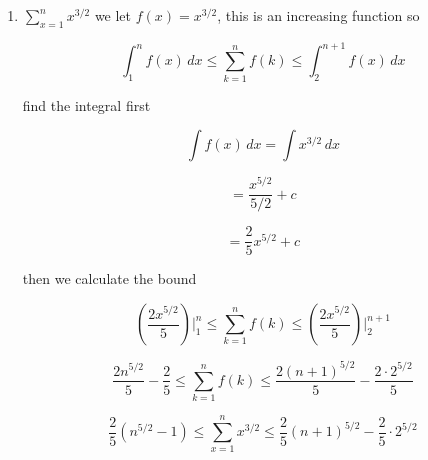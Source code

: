 \begin{enumerate}[label=\arabic*.]
\begin{center}
\begin{minipage}{0.45\linewidth}
        Lower bound $\int_{1}^{n+1} f(x)\,dx$
    \end{minipage}
    \hfill
    \begin{minipage}{0.45\linewidth}
        \centering

        Upper bound $\int_{1}^{n} f(x)\,dx + f(1)$
    \end{minipage}
    \end{center}

    \medskip
    \begin{center}
    \rule{0.3\linewidth}{0.2pt}
    \end{center}
    \medskip

    \item $\displaystyle \sum_{x=1}^n x^{3/2}$ we let $f(x)=x^{3/2}$, this is an increasing function so

    \[
        \int_{1}^{n} f(x)\,dx \le \sum_{k=1}^n f(k) \le \int_{2}^{n+1} f(x)\,dx
    \]

    find the integral first

    \[
        \int f(x)\,dx = \int x^{3/2}\,dx
    \]

    \[
        = \frac{x^{5/2}}{5/2} + c
    \]

    \[
        = \frac{2}{5}x^{5/2} + c
    \]

    then we calculate the bound

    \[
        \left(\frac{2x^{5/2}}{5}\right)\Bigg\rvert_{1}^{n} \le \sum_{k=1}^n f(k) \le \left(\frac{2x^{5/2}}{5}\right)\Bigg\rvert_{2}^{n+1}
    \]

    \[
        \frac{2n^{5/2}}{5} - \frac{2}{5} \le \sum_{k=1}^n f(k) \le \frac{2(n+1)^{5/2}}{5} - \frac{2 \cdot 2^{5/2}}{5}
    \]

    \[
        \boxed{\frac{2}{5}\left(n^{5/2} - 1\right) \le \sum_{x=1}^n x^{3/2} \le \frac{2}{5}(n+1)^{5/2} - \frac{2}{5} \cdot 2^{5/2}}
    \]


\end{enumerate}

